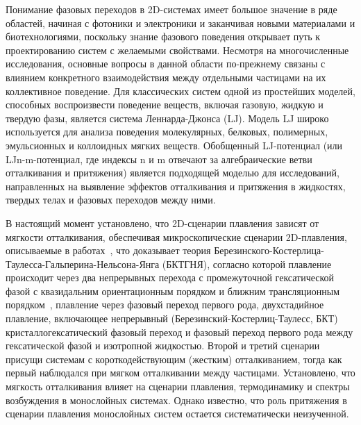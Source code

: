 Понимание фазовых переходов в 2D-системах имеет большое значение в ряде областей, начиная с фотоники и электроники  и заканчивая новыми материалами и биотехнологиями, поскольку знание фазового поведения открывает путь к проектированию систем с желаемыми свойствами. 
Несмотря на многочисленные исследования, основные вопросы в данной области по-прежнему связаны с влиянием конкретного взаимодействия между отдельными частицами на их коллективное поведение. 
Для классических систем одной из простейших моделей, способных воспроизвести поведение веществ, включая газовую, жидкую и твердую фазы, является система Леннарда-Джонса (LJ). 
Модель LJ широко используется для анализа поведения молекулярных, белковых, полимерных, эмульсионных и коллоидных мягких веществ. 
Обобщенный LJ-потенциал (или LJn-m-потенциал, где индексы n и m отвечают за алгебраические ветви отталкивания и притяжения) является подходящей моделью для исследований, направленных на выявление эффектов отталкивания и притяжения в жидкостях, твердых телах и фазовых переходов между ними.

В настоящий момент установлено, что 2D-сценарии плавления зависят от мягкости отталкивания, обеспечивая микроскопические сценарии 2D-плавления, описываемые в работах~\cite{10.3367/ufne.2017.06.038161, 10.3367/ufne.2018.04.038417}, что доказывает теория Березинского-Костерлица-Таулесса-Гальперина-Нельсона-Янга (БКТГНЯ), согласно которой плавление происходит через два непрерывных перехода с промежуточной гексатической фазой с квазидальним ориентационным порядком и ближним трансляционным порядком~\cite{10.1088/0022-3719/6/7/010, 10.1103/physrevlett.41.121, 10.1103/physrevb.19.2457, 10.1103/physrevb.19.1855}, плавление через фазовый переход первого рода, двухстадийное плавление, включающее непрерывный (Березинский-Костерлиц-Таулесс, БКТ) кристаллогексатический фазовый переход и фазовый переход первого рода между гексатической фазой и изотропной жидкостью.
Второй и третий сценарии присущи системам с короткодействующим (жестким) отталкиванием, тогда как первый наблюдался при мягком отталкивании между частицами. 
Установлено, что мягкость отталкивания влияет на сценарии плавления, термодинамику и спектры возбуждения в монослойных системах. 
Однако известно, что роль притяжения в сценарии плавления монослойных систем остается систематически неизученной.

